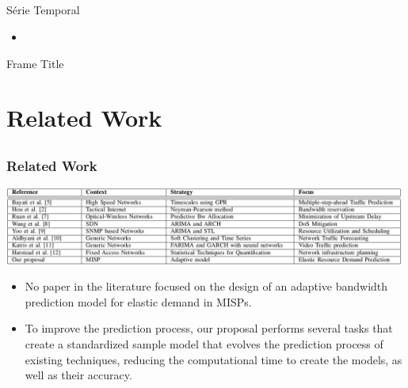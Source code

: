 \documentclass[aspectratio=169]{beamer}
\begin{document}
\subsection{}

\begin{frame}{Série Temporal}
    \begin{itemize}
        \item 
    \end{itemize}
\end{frame}

\begin{frame}{Frame Title}
    
\end{frame}


\section{Related Work}

\subsection{}
\begin{frame}

\frametitle{Related Work}

\includegraphics[width=0.99\textwidth,angle=0]{tableRelatedWork.png}

\begin{itemize}\footnotesize
    \item No paper in the literature focused on the design of an adaptive bandwidth prediction model for elastic demand in MISPs.
    \item To improve the prediction process, our proposal performs several tasks that create a standardized sample model that evolves the prediction process of existing techniques, reducing the computational time to create the models, as well as their accuracy.
\end{itemize}

\end{frame}
\end{document}
